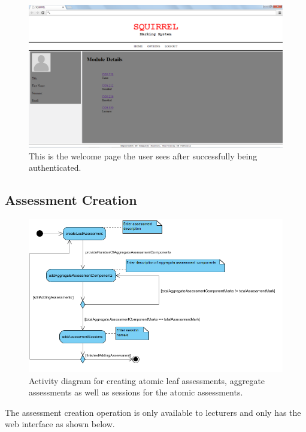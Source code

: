 \documentclass[11pt,a4paper]{article}
\begin{document}
\begin{figure}[h!]
\centering
\includegraphics[width=1.0\linewidth]{./web_modules&roles}
\caption{This is the welcome page the user sees after successfully being authenticated.}
\label{fig:web_modules&roles}
\end{figure}

\pagebreak

\subsection{Assessment Creation}
		\begin{figure}[h]
		\centering
		\includegraphics[width=1.0\linewidth]{./uml_assessmentCreation}
		\caption{Activity diagram for creating atomic leaf assessments, aggregate assessments as well as sessions for the atomic assessments.}
		\label{fig:uml_assessmentCreation}
		\end{figure}

	The assessment creation operation is only available to lecturers and only has the web interface as shown below.
	
\end{document}
